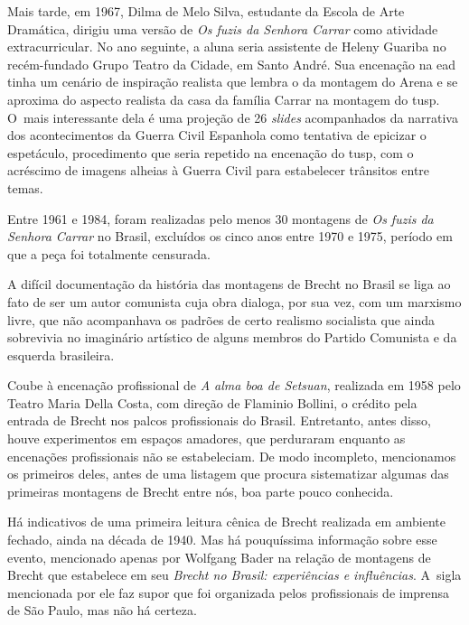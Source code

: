 Mais tarde, em 1967, Dilma de Melo Silva, estudante da Escola de Arte
Dramática, dirigiu uma versão de {\it Os fuzis da Senhora Carrar} como
atividade extracurricular. No ano seguinte, a aluna seria assistente de
Heleny Guariba no recém-fundado Grupo Teatro da Cidade, em Santo André.
Sua encenação na {\sc ead} tinha um cenário de inspiração realista que lembra
o da montagem do Arena e se aproxima do aspecto realista da casa da
família Carrar na montagem do {\sc tusp}. O~mais interessante dela é uma
projeção de 26 {\it slides} acompanhados da narrativa dos acontecimentos
da Guerra Civil Espanhola como tentativa de epicizar o espetáculo,
procedimento que seria repetido na encenação do {\sc tusp}, com o acréscimo de
imagens alheias à Guerra Civil para estabelecer trânsitos entre temas.

Entre 1961 e 1984, foram realizadas pelo menos 30 montagens de {\it Os
fuzis da Senhora Carrar} no Brasil, excluídos os cinco anos entre 1970 e
1975, período em que a peça foi totalmente censurada.

\subject{Brecht dos amadores}

A difícil documentação da história das montagens de Brecht no Brasil se
liga ao fato de ser um autor comunista cuja obra dialoga, por sua vez,
com um marxismo livre, que não acompanhava os padrões de certo realismo
socialista que ainda sobrevivia no imaginário artístico de alguns
membros do Partido Comunista e da esquerda brasileira.

Coube à encenação profissional de {\it A alma boa de Setsuan}, realizada
em 1958 pelo Teatro Maria Della Costa, com direção de Flaminio Bollini,
o crédito pela entrada de Brecht nos palcos profissionais do Brasil.
Entretanto, antes disso, houve experimentos em espaços amadores, que
perduraram enquanto as encenações profissionais não se estabeleciam. De
modo incompleto, mencionamos os primeiros deles, antes de uma listagem
que procura sistematizar algumas das primeiras montagens de Brecht entre
nós, boa parte pouco conhecida.

Há indicativos de uma primeira leitura cênica de Brecht realizada em
ambiente fechado, ainda na década de 1940. Mas há pouquíssima informação
sobre esse evento, mencionado apenas por Wolfgang Bader na relação de
montagens de Brecht que estabelece em seu {\it Brecht no Brasil:
experiências e influências}. A~sigla mencionada por ele faz supor que
foi organizada pelos profissionais de imprensa de São Paulo, mas não
há certeza.

